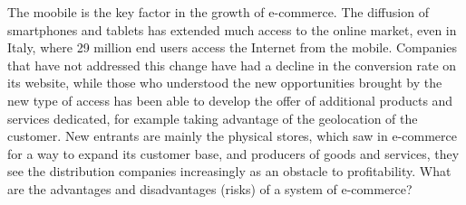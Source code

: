 \newline
The moobile is the key factor in the growth of e-commerce. The diffusion of smartphones and tablets has extended much access to the online market, even in Italy, where 29 million end users access the Internet from the mobile. Companies that have not addressed this change have had a decline in the conversion rate on its website, while those who understood the new opportunities brought by the new type of access has been able to develop the offer of additional products and services dedicated, for example taking advantage of the geolocation of the customer. New entrants are mainly the physical stores, which saw in e-commerce for a way to expand its customer base, and producers of goods and services, they see the distribution companies increasingly as an obstacle to profitability.
What are the advantages and disadvantages (risks) of a system of e-commerce?
\newline
